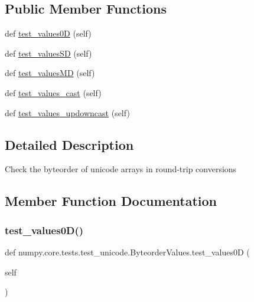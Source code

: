 \subsection*{Public Member Functions}
\begin{DoxyCompactItemize}
\item 
def \hyperlink{classnumpy_1_1core_1_1tests_1_1test__unicode_1_1ByteorderValues_a2a115a162baffc5ab7e32a7b0905b0c4}{test\+\_\+values0D} (self)
\item 
def \hyperlink{classnumpy_1_1core_1_1tests_1_1test__unicode_1_1ByteorderValues_ac6baf10b7c26e0651ee96a1c1dca7abc}{test\+\_\+values\+SD} (self)
\item 
def \hyperlink{classnumpy_1_1core_1_1tests_1_1test__unicode_1_1ByteorderValues_a44e68a73d6a74c7ea37b58b1d4e7ee01}{test\+\_\+values\+MD} (self)
\item 
def \hyperlink{classnumpy_1_1core_1_1tests_1_1test__unicode_1_1ByteorderValues_abbf145933eb1ec64247c9baedb617fdb}{test\+\_\+values\+\_\+cast} (self)
\item 
def \hyperlink{classnumpy_1_1core_1_1tests_1_1test__unicode_1_1ByteorderValues_a98b2505dcdac4b3a7205fe3ad76e87d0}{test\+\_\+values\+\_\+updowncast} (self)
\end{DoxyCompactItemize}


\subsection{Detailed Description}
\begin{DoxyVerb}Check the byteorder of unicode arrays in round-trip conversions\end{DoxyVerb}
 

\subsection{Member Function Documentation}
\mbox{\label{classnumpy_1_1core_1_1tests_1_1test__unicode_1_1ByteorderValues_a2a115a162baffc5ab7e32a7b0905b0c4}} 
\subsubsection{\texorpdfstring{test\+\_\+values0\+D()}{test\_values0D()}}
{\footnotesize\ttfamily def numpy.\+core.\+tests.\+test\+\_\+unicode.\+Byteorder\+Values.\+test\+\_\+values0D (\begin{DoxyParamCaption}\item[{}]{self }\end{DoxyParamCaption})}


